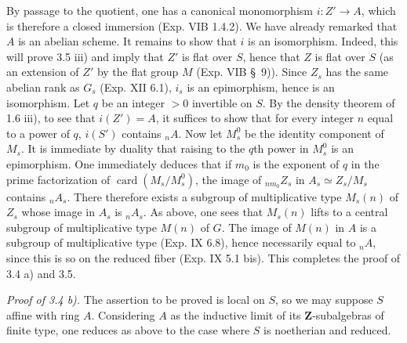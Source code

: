 By passage to the quotient, one has a canonical monomorphism $i:Z'\to A$, which is therefore a closed immersion (Exp. VIB 1.4.2). We have already remarked that $A$ is an abelian scheme. It remains to show that $i$ is an isomorphism. Indeed, this will prove 3.5 iii) and imply that $Z'$ is flat over $S$, hence that $Z$ is flat over $S$ (as an extension of $Z'$ by the flat group $M$ (Exp. VIB \S\ 9)). Since $Z_s$ has the same abelian rank as $G_s$ (Exp. XII 6.1), $i_s$ is an epimorphism, hence is an isomorphism. Let $q$ be an integer $>0$ invertible on $S$. By the density theorem of 1.6 iii), to see that $i(Z')=A$, it suffices to show that for every integer $n$ equal to a power of $q$, $i(S')$ contains ${}_nA$. Now let $M_s^0$ be the identity component of $M_s$. It is immediate by duality that raising to the $q$th power in $M_s^0$ is an epimorphism. One immediately deduces that if $m_0$ is the exponent of $q$ in the prime factorization of $\operatorname{card}(M_s/M_s^0)$, the image of ${}_{n m_0}Z_s$ in $A_s\simeq Z_s/M_s$ contains ${}_nA_s$. There therefore exists a subgroup of multiplicative type $M_s(n)$ of $Z_s$ whose image in $A_s$ is ${}_nA_s$. As above, one sees that $M_s(n)$ lifts to a central subgroup of multiplicative type $M(n)$ of $G$. The image of $M(n)$ in $A$ is a subgroup of multiplicative type (Exp. IX 6.8), hence necessarily equal to ${}_nA$, since this is so on the reduced fiber (Exp. IX 5.1 bis). This completes the proof of 3.4 a) and 3.5.

\par\noindent\emph{Proof of 3.4 b).}
The assertion to be proved is local on $S$, so we may suppose $S$ affine with ring $A$. Considering $A$ as the inductive limit of its $\mathbf Z$-subalgebras of finite type, one reduces as above to the case where $S$ is noetherian and reduced.

